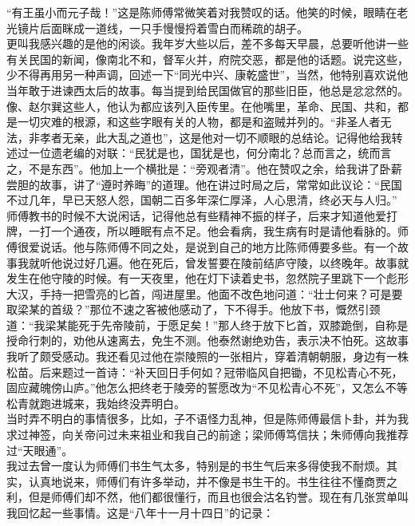 “有王虽小而元子哉！”这是陈师傅常微笑着对我赞叹的话。他笑的时候，眼睛在老光镜片后面眯成一道线，一只手慢慢捋着雪白而稀疏的胡子。\\

更叫我感兴趣的是他的闲谈。我年岁大些以后，差不多每天早晨，总要听他讲一些有关民国的新闻，像南北不和，督军火并，府院交恶，都是他的话题。说完这些，少不得再用另一种声调，回述一下“同光中兴、康乾盛世”，当然，他特别喜欢说他当年敢于进谏西太后的故事。每当提到给民国做官的那些旧臣，他总是忿忿然的。像、赵尔巽这些人，他认为都应该列入臣传里。在他嘴里，革命、民国、共和，都是一切灾难的根源，和这些字眼有关的人物，都是和盗贼并列的。“非圣人者无法，非孝者无亲，此大乱之道也”，这是他对一切不顺眼的总结论。记得他给我转述过一位遗老编的对联：“民犹是也，国犹是也，何分南北？总而言之，统而言之，不是东西”。他加上一个横批是：“旁观者清”。他在赞叹之余，给我讲了卧薪尝胆的故事，讲了“遵时养晦”的道理。他在讲过时局之后，常常如此议论：“民国不过几年，早已天怒人怨，国朝二百多年深仁厚泽，人心思清，终必天与人归。”\\

师傅教书的时候不大说闲话，记得他总有些精神不振的样子，后来才知道他爱打牌，一打一个通夜，所以睡眠有点不足。他会看病，我生病有时是请他看脉的。师傅很爱说话。他与陈师傅不同之处，是说到自己的地方比陈师傅要多些。有一个故事我就听他说过好几遍。他在死后，曾发誓要在陵前结庐守陵，以终晚年。故事就发生在他守陵的时候。有一天夜里，他在灯下读着史书，忽然院子里跳下一个彪形大汉，手持一把雪亮的匕首，闯进屋里。他面不改色地问道：“壮士何来？可是要取梁某的首级？”那位不速之客被他感动了，下不得手。他放下书，慨然引颈道：“我梁某能死于先帝陵前，于愿足矣！”那人终于放下匕首，双膝跪倒，自称是授命行刺的，劝他从速离去，免生不测。他泰然谢绝劝告，表示决不怕死。这故事我听了颇受感动。我还看见过他在崇陵照的一张相片，穿着清朝朝服，身边有一株松苗。后来题过一首诗：“补天回日手何如？冠带临风自把锄，不见松青心不死，固应藏魄傍山庐。”他怎么把终老于陵旁的誓愿改为“不见松青心不死”，又怎么不等松青就跑进城来，我始终没弄明白。\\

当时弄不明白的事情很多，比如，子不语怪力乱神，但是陈师傅最信卜卦，并为我求过神签，向关帝问过未来祖业和我自己的前途；梁师傅笃信扶；朱师傅向我推荐过“天眼通”。\\

我过去曾一度认为师傅们书生气太多，特别是的书生气后来多得使我不耐烦。其实，认真地说来，师傅们有许多举动，并不像是书生干的。书生往往不懂商贾之利，但是师傅们却不然，他们都很懂行，而且也很会沽名钓誉。现在有几张赏单叫我回忆起一些事情。这是“八年十一月十四日”的记录：\\

